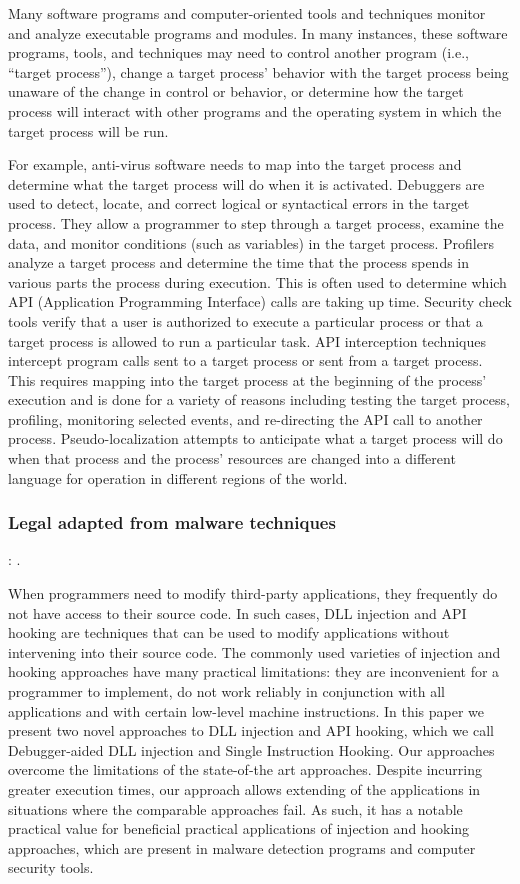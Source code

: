 \documentclass{article}
\begin{document}
Many software programs and computer-oriented tools and techniques monitor and analyze executable programs and modules. In many instances, these software programs, tools, and techniques may need to control another program (i.e., “target process”), change a target process' behavior with the target process being unaware of the change in control or behavior, or determine how the target process will interact with other programs and the operating system in which the target process will be run.

For example, anti-virus software needs to map into the target process and determine what the target process will do when it is activated. Debuggers are used to detect, locate, and correct logical or syntactical errors in the target process. They allow a programmer to step through a target process, examine the data, and monitor conditions (such as variables) in the target process. Profilers analyze a target process and determine the time that the process spends in various parts the process during execution. This is often used to determine which API (Application Programming Interface) calls are taking up time. Security check tools verify that a user is authorized to execute a particular process or that a target process is allowed to run a particular task. API interception techniques intercept program calls sent to a target process or sent from a target process. This requires mapping into the target process at the beginning of the process' execution and is done for a variety of reasons including testing the target process, profiling, monitoring selected events, and re-directing the API call to another process. Pseudo-localization attempts to anticipate what a target process will do when that process and the process' resources are changed into a different language for operation in different regions of the world.

\subsubsection{Legal adapted from malware techniques}

\textbf{}: \textcite{Berdajs:2010}.

When programmers need to modify third-party applications, they frequently do not have access to their source code. In such cases, DLL injection and API hooking are techniques that can be used to modify applications without intervening into their source code. The commonly used varieties of injection and hooking approaches have many practical limitations: they are inconvenient for a programmer to implement, do not work reliably in conjunction with all applications and with certain low-level machine instructions. In this paper we present two novel approaches to DLL injection and API hooking, which we call Debugger-aided DLL injection and Single Instruction Hooking. Our approaches overcome the limitations of the state-of-the art approaches. Despite incurring greater execution times, our approach allows extending of the applications in situations where the comparable approaches fail. As such, it has a notable practical value for beneficial practical applications of injection and hooking approaches, which are present in malware detection programs and computer security tools.
\end{document}
